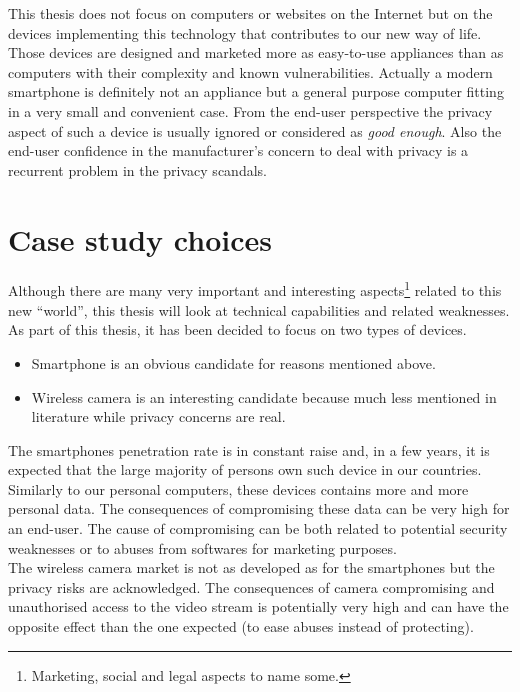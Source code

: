 This thesis does not focus on computers or websites on the Internet but on the devices implementing this technology that contributes to our new way of life.
Those devices are designed and marketed more as easy-to-use appliances than as computers with their complexity and known vulnerabilities.
Actually a modern smartphone is definitely not an appliance but a general purpose computer fitting in a very small and convenient case.
From the end-user perspective the privacy aspect of such a device is usually ignored or considered as \emph{good enough}.
Also the end-user confidence in the manufacturer’s concern to deal with privacy is a recurrent problem in the privacy scandals.

\section{Case study choices}

Although there are many very important and interesting aspects\footnote{Marketing, social and legal aspects to name some.} related to this new ``world'', this thesis will look at technical capabilities and related weaknesses.
As part of this thesis, it has been decided to focus on two types of devices.
\begin{itemize}
\item Smartphone is an obvious candidate for reasons mentioned above.
\item Wireless camera is an interesting candidate because much less mentioned in literature while privacy concerns are real.
\end{itemize}

The smartphones penetration rate is in constant raise and, in a few years, it is expected that the large majority of persons own such device in our countries.
Similarly to our personal computers, these devices contains more and more personal data.
The consequences of compromising these data can be very high for an end-user.
The cause of compromising can be both related to potential security weaknesses or to abuses from softwares for marketing purposes.\\

The wireless camera market is not as developed as for the smartphones but the privacy risks are acknowledged.
The consequences of camera compromising and unauthorised access to the video stream is potentially very high and can have the opposite effect than the one expected (to ease abuses instead of protecting).\\

